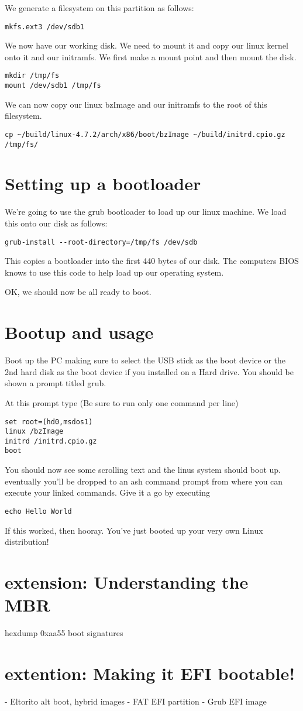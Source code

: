 \documentclass[twocolumn]{article}
\begin{document}
We generate a filesystem on this partition as follows:
\begin{lstlisting}
mkfs.ext3 /dev/sdb1
\end{lstlisting}
We now have our working disk. We need to mount it and copy our linux kernel onto it and our initramfs. We first make a mount point and then mount the disk.
\begin{lstlisting}
mkdir /tmp/fs
mount /dev/sdb1 /tmp/fs
\end{lstlisting}
We can now copy our linux bzImage and our initramfs to the root of this filesystem.
\begin{lstlisting}
cp ~/build/linux-4.7.2/arch/x86/boot/bzImage ~/build/initrd.cpio.gz /tmp/fs/
\end{lstlisting}

\section{Setting up a bootloader}
We're going to use the grub bootloader to load up our linux machine. We load this onto our disk as follows:
\begin{lstlisting}
grub-install --root-directory=/tmp/fs /dev/sdb
\end{lstlisting}

This copies a bootloader into the first 440 bytes of our disk. The computers BIOS knows to use this code to help load up our operating system.

OK, we should now be all ready to boot.

\section{Bootup and usage}

Boot up the PC making sure to select the USB stick as the boot device or the 2nd hard disk as the boot device if you installed on a Hard drive. You should be shown a prompt titled grub.

At this prompt type (Be sure to run only one command per line)
\begin{lstlisting}
set root=(hd0,msdos1)
linux /bzImage
initrd /initrd.cpio.gz
boot
\end{lstlisting}

You should now see some scrolling text and the linus system should boot up. eventually you'll be dropped to an ash command prompt from where you can execute your linked commands. Give it a go by executing
\begin{lstlisting}
echo Hello World
\end{lstlisting}

If this worked, then hooray. You've just booted up your very own Linux distribution!

\section{extension: Understanding the MBR}
hexdump 0xaa55 boot signatures

\section{extention: Making it EFI bootable!}

- Eltorito alt boot, hybrid images
- FAT EFI partition
- Grub EFI image
\end{document}
